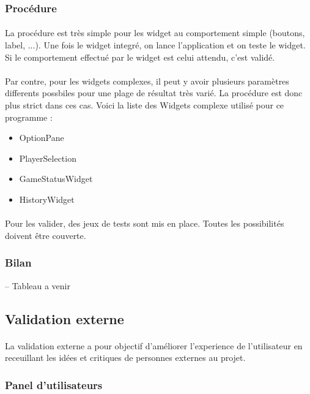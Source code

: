 \documentclass[11pt]{article} %
\begin{document}
\subsubsection{Procédure}
\paragraph{}
La procédure est très simple pour les widget au comportement simple (boutons, label, ...). Une fois le widget integré, on lance l'application et on teste le widget. Si le comportement effectué par le widget est celui attendu, c'est validé.
\paragraph{}
Par contre, pour les widgets complexes, il peut y avoir plusieurs paramètres differents possbiles pour une plage de résultat très varié. La procédure est donc plus strict dans ces cas. Voici la liste des Widgets complexe utilisé pour ce programme :
\begin{itemize}
\item OptionPane
\item PlayerSelection
\item GameStatusWidget
\item HistoryWidget
\end{itemize}
\paragraph{}
Pour les valider, des jeux de tests sont mis en place. Toutes les possibilités doivent être couverte.


\subsubsection{Bilan}
-- Tableau a venir

\subsection{Validation externe}
\paragraph{}
La validation externe a pour objectif d'améliorer l'experience de l'utilisateur en receuillant les idées et critiques de personnes externes au projet.

\subsubsection{Panel d'utilisateurs}
\end{document}
